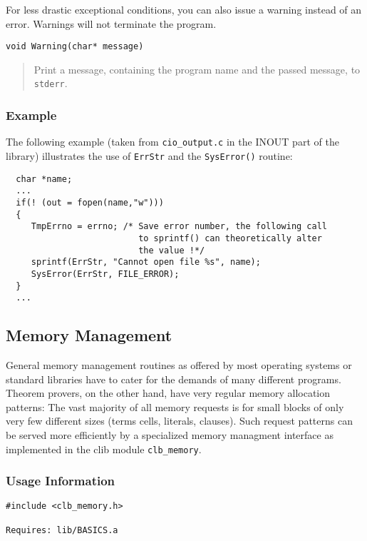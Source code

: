 For less drastic exceptional conditions, you can also issue a warning
instead of an error. Warnings will not terminate the program.

\begin{verbatim}
void Warning(char* message)
\end{verbatim}
\begin{quote}
  Print a message, containing the program name and the passed message,
  to \texttt{stderr}.
\end{quote}


\subsubsection{Example}

The following example (taken from \texttt{cio\_output.c} in the INOUT
part of the library) illustrates the use of \texttt{ErrStr} and the
\texttt{SysError()} routine:

\begin{verbatim}
  char *name;
  ...
  if(! (out = fopen(name,"w")))
  {
     TmpErrno = errno; /* Save error number, the following call
                          to sprintf() can theoretically alter
                          the value !*/
     sprintf(ErrStr, "Cannot open file %s", name);
     SysError(ErrStr, FILE_ERROR);
  }
  ...
\end{verbatim}



\subsection{Memory Management}
\label{sec:basics:memory}

General memory management routines as offered by most operating
systems or standard libraries have to cater for the demands of many
different programs. Theorem provers, on the other hand, have very
regular memory allocation patterns: The vast majority of all memory
requests is for small blocks of only very few different sizes (terms
cells, literals, clauses). Such request patterns can be served more
efficiently by a specialized memory managment interface as implemented
in the clib module \texttt{clb\_memory}.

\subsubsection{Usage Information}

\begin{verbatim}
#include <clb_memory.h>

Requires: lib/BASICS.a
\end{verbatim}

